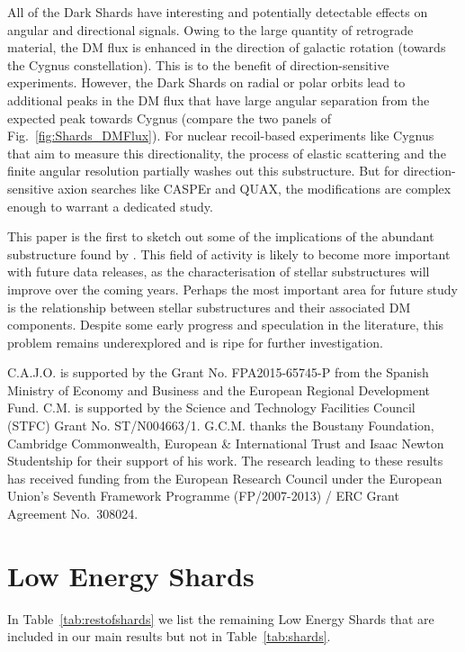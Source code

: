 \documentclass[prd,10pt,twocolumn,showpacs,nofootinbib,aps,superscriptaddress,preprintnumbers]{revtex4-1}
\newcommand{\Gaia}{\!{\it Gaia}\xspace}
\begin{document}
All of the Dark Shards have interesting and potentially detectable effects on angular and directional signals. Owing to the large quantity of retrograde material, the DM flux is enhanced in the direction of galactic rotation (towards the Cygnus constellation). This is to the benefit of direction-sensitive experiments.  However, the Dark Shards on radial or polar orbits lead to additional peaks in the DM flux that have large angular separation from the expected peak towards Cygnus (compare the two panels of Fig.~\ref{fig:Shards_DMFlux}). For nuclear recoil-based experiments like {\sc Cygnus} that aim to measure this directionality, the process of elastic scattering and the finite angular resolution partially washes out this substructure. 
But for direction-sensitive axion searches like CASPEr and QUAX, the modifications are  complex enough to warrant a dedicated study.

This paper is the first to sketch out some of the implications of the abundant substructure found by \Gaia. This field of activity is likely to become more important with future data releases, as the characterisation of stellar substructures will improve over the coming years. Perhaps the most important area for future study is the relationship between stellar substructures and their associated DM components. Despite some early progress and speculation in the literature, this problem remains underexplored and is ripe for further investigation.


\acknowledgments
C.A.J.O. is supported by the Grant No. FPA2015-65745-P from the Spanish Ministry of Economy and Business and the European Regional Development Fund. 
C.M. is supported by the Science and Technology Facilities Council (STFC) Grant No. ST/N004663/1. 
G.C.M. thanks the Boustany Foundation, Cambridge Commonwealth, European \& International Trust and Isaac Newton Studentship for their support of his work. 
The research leading to these results has received funding from the European Research Council under the European Union's Seventh Framework Programme (FP/2007-2013) / ERC Grant Agreement No.\ 308024.

\appendix
\section{Low Energy Shards}\label{sec:lowEshards}

In Table~\ref{tab:restofshards} we list the remaining Low Energy Shards that are included in our main results but not in Table~\ref{tab:shards}.

\maketitle
\flushbottom



\end{document}
